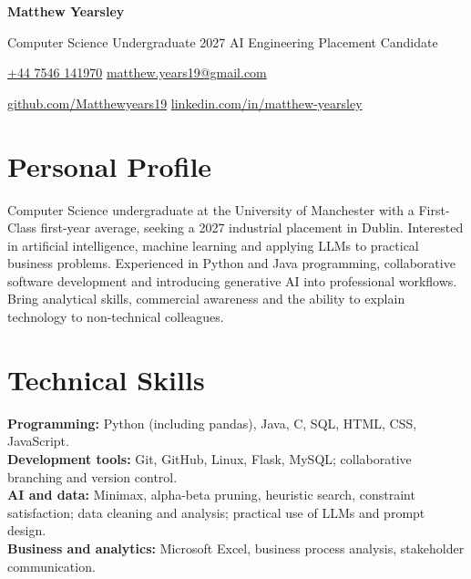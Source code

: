 \documentclass[11pt,a4paper]{article}
\begin{document}
\begin{center}
 {\fontsize{22}{25}\selectfont\bfseries\color{accent} Matthew Yearsley}\par
 \vspace{3pt}
 {\small Computer Science Undergraduate \textbar{} 2027 AI Engineering Placement Candidate}\par
 \vspace{5pt}
 {\small
 \href{tel:+447546141970}{+44 7546 141970}
 \quad\textcolor{rulecolour}{\textbar}\quad
 \href{mailto:matthew.years19@gmail.com}{matthew.years19@gmail.com}
 }\par
 \vspace{2pt}
 {\small
 \href{https://github.com/Matthewyears19}{github.com/Matthewyears19}
 \quad\textcolor{rulecolour}{\textbar}\quad
 \href{https://www.linkedin.com/in/matthew-yearsley}{linkedin.com/in/matthew-yearsley}
 }\par
\end{center}
\vspace{-7pt}

\section*{Personal Profile}
Computer Science undergraduate at the University of Manchester with a First-Class first-year average, seeking a 2027 industrial placement in Dublin. Interested in artificial intelligence, machine learning and applying LLMs to practical business problems. Experienced in Python and Java programming, collaborative software development and introducing generative AI into professional workflows. Bring analytical skills, commercial awareness and the ability to explain technology to non-technical colleagues.

\section*{Technical Skills}
\textbf{Programming:} Python (including pandas), Java, C, SQL, HTML, CSS, JavaScript.\\[2pt]
\textbf{Development tools:} Git, GitHub, Linux, Flask, MySQL; collaborative branching and version control.\\[2pt]
\textbf{AI and data:} Minimax, alpha-beta pruning, heuristic search, constraint satisfaction; data cleaning and analysis; practical use of LLMs and prompt design.\\[2pt]
\textbf{Business and analytics:} Microsoft Excel, business process analysis, stakeholder communication.
\end{document}
